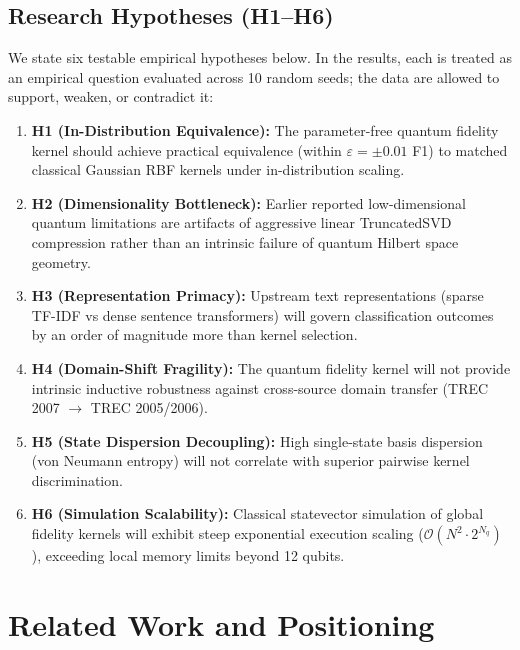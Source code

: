 \documentclass{article}
\begin{document}
\subsection{Research Hypotheses (H1–H6)}
We state six testable empirical hypotheses below. In the results, each is treated as an empirical question evaluated across 10 random seeds; the data are allowed to support, weaken, or contradict it:
\begin{enumerate}
    \setlength{\itemsep}{2pt}
    \item \textbf{H1 (In-Distribution Equivalence):} The parameter-free quantum fidelity kernel should achieve practical equivalence (within $\varepsilon = \pm 0.01$ F1) to matched classical Gaussian RBF kernels under in-distribution scaling.
    \item \textbf{H2 (Dimensionality Bottleneck):} Earlier reported low-dimensional quantum limitations are artifacts of aggressive linear TruncatedSVD compression rather than an intrinsic failure of quantum Hilbert space geometry.
    \item \textbf{H3 (Representation Primacy):} Upstream text representations (sparse TF-IDF vs dense sentence transformers) will govern classification outcomes by an order of magnitude more than kernel selection.
    \item \textbf{H4 (Domain-Shift Fragility):} The quantum fidelity kernel will not provide intrinsic inductive robustness against cross-source domain transfer (TREC 2007 $\to$ TREC 2005/2006).
    \item \textbf{H5 (State Dispersion Decoupling):} High single-state basis dispersion (von Neumann entropy) will not correlate with superior pairwise kernel discrimination.
    \item \textbf{H6 (Simulation Scalability):} Classical statevector simulation of global fidelity kernels will exhibit steep exponential execution scaling ($\mathcal{O}(N^2 \cdot 2^{N_q})$), exceeding local memory limits beyond 12 qubits.
\end{enumerate}

\section{Related Work and Positioning}
\label{sec:related}
\end{document}
